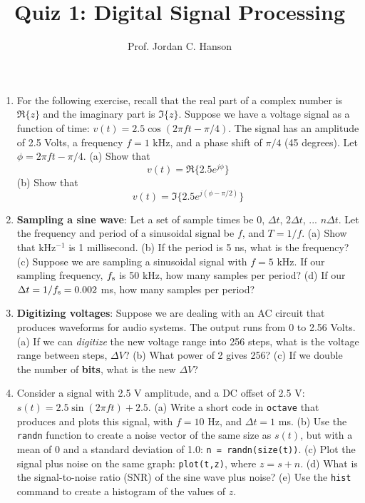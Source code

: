 \documentclass{article}
\begin{document}
\twocolumn

\title{Quiz 1: Digital Signal Processing}
\author{Prof. Jordan C. Hanson}

\maketitle
\small

\begin{enumerate}
\item For the following exercise, recall that the real part of a complex number is $\Re\lbrace z\rbrace$ and the imaginary part is $\Im\lbrace z\rbrace$.  Suppose we have a voltage signal as a function of time: $v(t) = 2.5 \cos(2\pi ft - \pi/4)$.  The signal has an amplitude of 2.5 Volts, a frequency $f = 1$ kHz, and a phase shift of $\pi/4$ (45 degrees).  Let $\phi = 2\pi ft - \pi/4$.  (a) Show that 
\begin{equation}
v(t) = \Re \lbrace 2.5 e^{j\phi} \rbrace
\end{equation}
(b) Show that 
\begin{equation}
v(t) = \Im \lbrace 2.5 e^{j(\phi-\pi/2)} \rbrace
\end{equation} \vspace{2cm}
\item \textbf{Sampling a sine wave}: Let a set of sample times be $0$, $\Delta t$, $2\Delta t$, ... $n\Delta t$.  Let the frequency and period of a sinusoidal signal be $f$, and $T = 1/f$.  (a) Show that kHz$^{-1}$ is 1 millisecond.  (b) If the period is 5 ns, what is the frequency? (c) Suppose we are sampling a sinusoidal signal with $f = 5$ kHz.  If our sampling frequency, $f_{\rm s}$ is 50 kHz, how many samples per period? (d) If our $\Delta t = 1/f_{\rm s} = 0.002$ ms, how many samples per period? \\ \vspace{4cm}
\item \textbf{Digitizing voltages}: Suppose we are dealing with an AC circuit that produces waveforms for audio systems.  The output runs from 0 to 2.56 Volts.  (a) If we can \textit{digitize} the new voltage range into 256 steps, what is the voltage range between steps, $\Delta V$? (b) What power of 2 gives 256? (c) If we double the number of \textbf{bits}, what is the new $\Delta V$? \\ \vspace{4cm}
\item Consider a signal with 2.5 V amplitude, and a DC offset of 2.5 V: $s(t) = 2.5\sin(2\pi f t) + 2.5$.  (a) Write a short code in \verb+octave+ that produces and plots this signal, with $f = 10$ Hz, and $\Delta t = 1$ ms. (b) Use the \verb+randn+ function to create a noise vector of the same size as $s(t)$, but with a mean of 0 and a standard deviation of 1.0: \verb+n = randn(size(t))+.  (c) Plot the signal plus noise on the same graph: \verb+plot(t,z)+, where $z = s+n$.  (d) What is the signal-to-noise ratio (SNR) of the sine wave plus noise? (e) Use the \verb+hist+ command to create a histogram of the values of $z$. \\ \vspace{4cm}

\end{enumerate}
\end{document}
